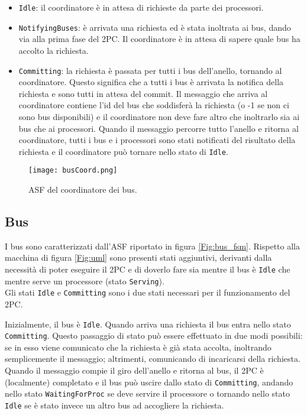 \begin{itemize}
\item \texttt{Idle}: il coordinatore è in attesa di richieste da parte dei processori.
\item \texttt{NotifyingBuses}: è arrivata una richiesta ed è stata inoltrata ai bus, dando via alla prima fase del 2PC. Il coordinatore è in attesa di sapere quale bus ha accolto la richiesta.
\item \texttt{Committing}: la richiesta è passata per tutti i bus dell'anello, tornando al coordinatore. Questo significa che a tutti i bus è arrivata la notifica della richiesta e sono tutti in attesa del commit. Il messaggio che arriva al coordinatore contiene l'id del bus che soddisferà la richiesta (o -1 se non ci sono bus disponibili) e il coordinatore non deve fare altro che inoltrarlo sia ai bus che ai processori. Quando il messaggio percorre tutto l'anello e ritorna al coordinatore, tutti i bus e i processori sono stati notificati del risultato della richiesta e il coordinatore può tornare nello stato di \texttt{Idle}.
\end{itemize}

\pagebreak

\begin{figure}
\vspace{-2cm}
\centerline{\texttt{[image: busCoord.png]}}
\caption{ASF del coordinatore dei bus.}
\label{Fig:coord_fsm}
\end{figure}

\subsection{Bus} 
I bus sono caratterizzati dall'ASF riportato in figura \ref{Fig:bus_fsm}. Rispetto alla macchina di figura \ref{Fig:uml} sono presenti stati aggiuntivi, derivanti dalla necessità di poter eseguire il 2PC e di doverlo fare sia mentre il bus è \texttt{Idle} che mentre serve un processore (stato \texttt{Serving}). \\


Gli stati \texttt{Idle} e \texttt{Committing} sono i due stati necessari per il funzionamento del 2PC. 

Inizialmente, il bus è \texttt{Idle}. Quando arriva una richiesta il bus entra nello stato \texttt{Committing}. Questo passaggio di stato può essere effettuato in due modi possibili: se in esso viene comunicato che la richiesta è già stata accolta, inoltrando semplicemente il messaggio; altrimenti, comunicando di incaricarsi della richiesta. Quando il messaggio compie il giro dell'anello e ritorna al bus, il 2PC è (localmente) completato e il bus può uscire dallo stato di \texttt{Committing}, andando nello stato \texttt{WaitingForProc} se deve servire il processore o tornando nello stato \texttt{Idle} se è stato invece un altro bus ad accogliere la richiesta.\\


